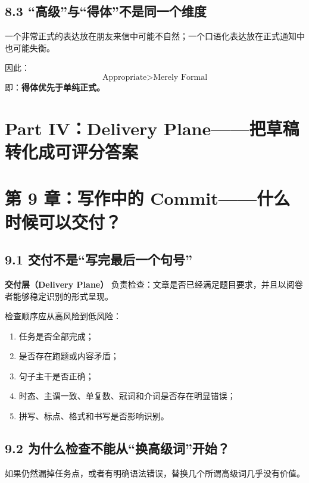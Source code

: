 \documentclass[11pt,a4paper]{ctexart}
\newcommand{\kw}[1]{\textbf{#1}}
\newcommand{\term}[2]{\textbf{#1（#2）}}
\begin{document}
\subsection{8.3 “高级”与“得体”不是同一个维度}
一个非常正式的表达放在朋友来信中可能不自然；一个口语化表达放在正式通知中也可能失衡。

因此：
\[
\boxed{
\text{Appropriate}
>
\text{Merely Formal}
}
\]
即：\kw{得体优先于单纯正式。}

\newpage
\section{Part IV：Delivery Plane——把草稿转化成可评分答案}

\section{第 9 章：写作中的 Commit——什么时候可以交付？}

\subsection{9.1 交付不是“写完最后一个句号”}
\term{交付层}{Delivery Plane} 负责检查：文章是否已经满足题目要求，并且以阅卷者能够稳定识别的形式呈现。

检查顺序应从高风险到低风险：
\begin{enumerate}
  \item 任务是否全部完成；
  \item 是否存在跑题或内容矛盾；
  \item 句子主干是否正确；
  \item 时态、主谓一致、单复数、冠词和介词是否存在明显错误；
  \item 拼写、标点、格式和书写是否影响识别。
\end{enumerate}

\subsection{9.2 为什么检查不能从“换高级词”开始？}
如果仍然漏掉任务点，或者有明确语法错误，替换几个所谓高级词几乎没有价值。
\end{document}

